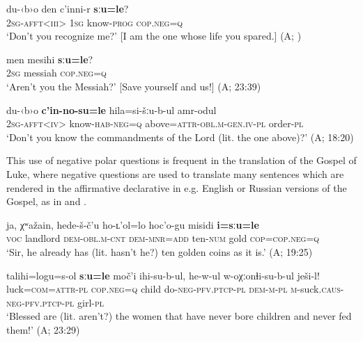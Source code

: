 \documentclass[output=paper,colorlinks=true, citecolor=brown]{langscibook}
\begin{document}
\ea
    \label{ex:and:14}
    \gll du{}-‹b›o den c’inni{}-r \textbf{sːu=le}?\\
          \textsc{2sg}{}-\textsc{afft<iii>} \textsc{1sg} know-\textsc{prog} \textsc{cop.neg=q}\\
     ‘Don’t you recognize me?’ [I am the one whose life you spared.] (A; ) 
\z
         
\ea
    \label{ex:and:15}
    \gll men mesihi \textbf{sːu=le}?\\
          \textsc{2sg} messiah \textsc{cop.neg=q}\\
     ‘Aren’t you the Messiah?’ [Save yourself and us!] (A;  23:39) 
\z

\ea
    \label{ex:and:16} 
    \gll du{}-‹b›o \textbf{c’in{}-no{}-su=le} hila=si{}-šːu{}-b{}-ul amr{}-odul\\
          \textsc{2sg}{}-\textsc{afft<iv>} know-\textsc{hab-neg=q} above=\textsc{attr-obl.m-gen.iv-pl} order-\textsc{pl}\\
    \glt ‘Don’t you know the commandments of the Lord (lit. the one above)?’ (A;  18:20)
\z 

This use of negative polar questions is frequent in the translation of the Gospel of Luke, where negative questions are used to translate many sentences which are rendered in the affirmative declarative in e.g. English or Russian versions of the Gospel, as in  and .



\ea
    \label{ex:and:17} 
        \gll ja, χʷažain, hede{}-š{}-č’u ho{}-ʟ’ol=lo hoc’o{}-gu misidi \textbf{i=sːu=le}\\
    \textsc{voc} landlord \textsc{dem-obl.m-cnt} \textsc{dem-mnr=add} ten-\textsc{num}  gold \textsc{cop=cop.neg=q}\\
    \glt ‘Sir, he already has (lit. hasn’t he?) ten golden coins as it is.’ (A;  19:25)
\z 

\ea
    \label{ex:and:18}
    \gll talihi=logu=s{}-ol \textbf{sːu=le} moč’i ihi{}-su{}-b{}-ul, he-w-ul w{}-oχːonɬi{}-su{}-b{}-ul ješi{}-l!\\
          luck=\textsc{com=attr-pl} \textsc{cop.neg=q} child do-\textsc{neg-pfv.ptcp-pl}  \textsc{dem-m-pl} \textsc{m-}suck.\textsc{caus-neg-pfv.ptcp-pl} girl-\textsc{pl}\\
    \glt ‘Blessed are (lit. aren’t?) the women that have never bore children and never fed them!’ (A;  23:29)
\z 
\end{document}
